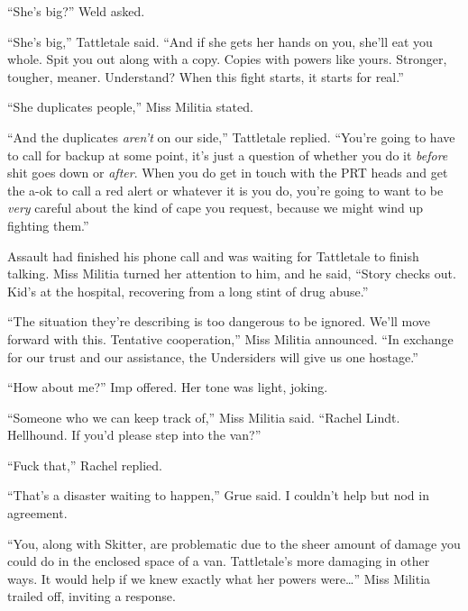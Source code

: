 ``She's big?''  Weld asked.



``She's big,'' Tattletale said.  ``And if she gets her hands on you, she'll eat you whole.  Spit you out along with a copy.  Copies with powers like yours.  Stronger, tougher, meaner.  Understand?  When this fight starts, it starts for real.''



``She duplicates people,'' Miss Militia stated.



``And the duplicates\emph{ aren't} on our side,'' Tattletale replied.  ``You're going to have to call for backup at some point, it's just a question of whether you do it \emph{before} shit goes down or \emph{after}.  When you do get in touch with the PRT heads and get the a-ok to call a red alert or whatever it is you do, you're going to want to be \emph{very} careful about the kind of cape you request, because we might wind up fighting them.''



Assault had finished his phone call and was waiting for Tattletale to finish talking.  Miss Militia turned her attention to him, and he said, ``Story checks out.  Kid's at the hospital, recovering from a long stint of drug abuse.''



``The situation they're describing is too dangerous to be ignored.  We'll move forward with this.  Tentative cooperation,'' Miss Militia announced.  ``In exchange for our trust and our assistance, the Undersiders will give us one hostage.''



``How about me?'' Imp offered.  Her tone was light, joking.



``Someone who we can keep track of,'' Miss Militia said.  ``Rachel Lindt.  Hellhound.  If you'd please step into the van?''



``Fuck that,'' Rachel replied.



``That's a disaster waiting to happen,'' Grue said.  I couldn't help but nod in agreement.



``You, along with Skitter, are problematic due to the sheer amount of damage you could do in the enclosed space of a van.  Tattletale's more damaging in other ways.  It would help if we knew exactly what her powers were\ldots''  Miss Militia trailed off, inviting a response.



